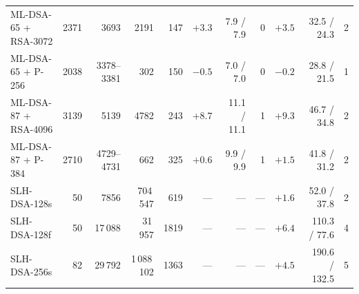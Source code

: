 \documentclass[conference,a4paper]{IEEEtran}
\newcommand{\newgreen}[1]{{\color{green!50!black}#1}}
\newcommand{\newviolet}[1]{{\color{violet}#1}}
\begin{document}
{\begin{table}[!tb]
\begin{tabular}{@{}lrrrrrrrrrr@{}}
ML-DSA-65 + RSA-3072 & 2371 & 3693 & 2191 & 147 & \newgreen{$+3.3$} & 7.9 / 7.9 & 0 & \newgreen{$+3.5$} & 32.5 / 24.3 & 2 \\
ML-DSA-65 + P-256 & 2038 & 3378--3381 & 302 & 150 & \newgreen{$-0.5$} & 7.0 / 7.0 & 0 & \newgreen{$-0.2$} & 28.8 / 21.5 & \newviolet{1} \\
ML-DSA-87 + RSA-4096 & 3139 & 5139 & 4782 & 243 & \newgreen{$+8.7$} & 11.1 / 11.1 & 1 & \newgreen{$+9.3$} & 46.7 / 34.8 & 2 \\
ML-DSA-87 + P-384 & 2710 & 4729--4731 & 662 & 325 & \newgreen{$+0.6$} & 9.9 / 9.9 & 1 & \newgreen{$+1.5$} & 41.8 / 31.2 & 2 \\
SLH-DSA-128s & 50 & 7856 & 704\,547 & 619 & --- & --- & --- & \newgreen{$+1.6$} & 52.0 / 37.8 & 2 \\
SLH-DSA-128f & 50 & 17\,088 & 31\,957 & 1819 & --- & --- & --- & \newgreen{$+6.4$} & 110.3 / 77.6 & 4 \\
SLH-DSA-256s & 82 & 29\,792 & 1\,088\,102 & 1363 & --- & --- & --- & \newgreen{$+4.5$} & 190.6 / 132.5 & 5 \\
\bottomrule
\end{tabular}
\end{table}

}
\end{document}
